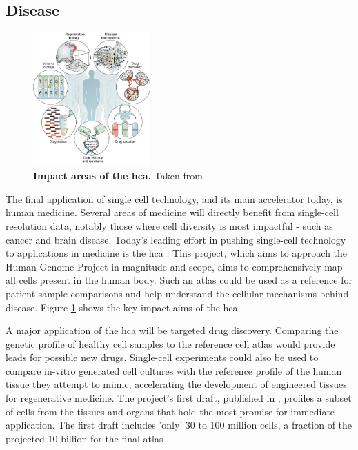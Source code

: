 \subsection{Disease}
\begin{figure}
	\centering
	\includegraphics[width=0.40\textwidth]{./ims/hca2017.png}
	\caption[Impact areas of the Human Cell Atlas]{\textbf{Impact areas of the \acrlong{hca}.} Taken from \cite{hca2017}}
	\label{fig:hca2017}
	\vspace{-20pt}
\end{figure}

The final application of single cell technology, and its main accelerator today, is human medicine. Several areas of medicine will directly benefit from single-cell resolution data, notably those where cell diversity is most impactful - such as cancer and brain disease. Today's leading effort in pushing single-cell technology to applications in medicine is the \acrfull{hca} \citep{regev2017}. This project, which aims to approach the Human Genome Project in magnitude and scope, aims to comprehensively map all cells present in the human body. Such an atlas could be used as a reference for patient sample comparisons and help understand the cellular mechanisms behind disease. Figure \ref{fig:hca2017} shows the key impact aims of the \acrshort{hca}.\pms

A major application of the \acrshort{hca} will be targeted drug discovery. Comparing the genetic profile of healthy cell samples to the reference cell atlas would provide leads for possible new drugs. Single-cell experiments could also be used to compare in-vitro generated cell cultures with the reference profile of the human tissue they attempt to mimic, accelerating the development of engineered tissues for regenerative medicine. The project's first draft, published in \citeyear{hca2017}, profiles a subset of cells from the tissues and organs that hold the most promise for immediate application. The first draft includes 'only' 30 to 100 million cells, a fraction of the projected 10 billion for the final atlas \citep{hca2017}. \pms

